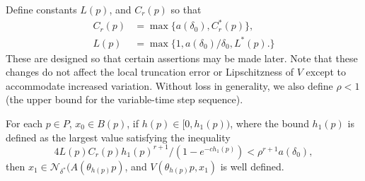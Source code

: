 Define constants $L(p)$, and $C_r(p)$ so that
\begin{align}
C_r(p) &= \max \{ a(\delta_0), C^*_r(p) \}, \label{eqcrdefn} \\
L(p) &= \max \{ 1, a(\delta_0)/\delta_0, L^*(p). \}
   \label{eqldefn}
\end{align}
These are designed so that certain assertions may be made later.
Note that these changes do not affect the
local truncation error or Lipschitzness of $V$ except to
accommodate increased variation. Without loss in generality, we
also define $\rho < 1$ (the upper bound for the variable-time step
sequence).

\begin{lemma}[B1]
    For each $p \in P$, $x_0 \in B(p)$, if $h(p) \in [0, h_1(p))$, where
  the bound $h_1(p)$ is defined as the largest value satisfying the
  inequality
  \begin{equation}\label{h1boundeq}
    4 L(p)C_r(p)h_1(p)^{r+1}/(1 - e^{-ch_1(p)}) <
      \rho^{r+1} a ( \delta_0 ),
  \end{equation}
  then $x_1 \in \mathcal{N}_{\delta^*}(A(\theta_{h(p)}p)$, and $V(\theta_{h(p)}p, x_1)$ is well defined.
\end{lemma}
